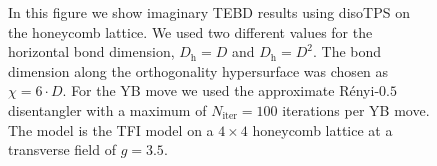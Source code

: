 \begin{figure}
\begin{minipage}{1.0\textwidth}
%
	\end{minipage}
	\caption{In this figure we show imaginary TEBD results using disoTPS on the honeycomb lattice. We used two different values for the horizontal bond dimension, $D_\text{h} = D$ and $D_\text{h} = D^2$. The bond dimension along the orthogonality hypersurface was chosen as $\chi = 6\cdot D$. For the YB move we used the approximate Rényi-$0.5$ disentangler with a maximum of $N_\text{iter} = 100$ iterations per YB move. The model is the TFI model on a $4\times 4$ honeycomb lattice at a transverse field of $g = 3.5$.}
	\label{fig:tfi_gs_energy_vs_dtau_honeycomb}
\end{figure}